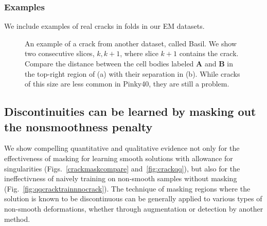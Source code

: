 \documentclass{article}
\begin{document}
\subsubsection{Examples}
We include examples of real cracks in folds in our EM datasets.

\begin{figure}[htp]
	\centering
	\caption[Example of a crack in the Basil EM dataset]{An example of a crack from another dataset, called Basil. We show two consecutive slices, $k,k+1$, where slice $k+1$ contains the crack. Compare the distance between the cell bodies labeled \textbf{A} and \textbf{B} in the top-right region of (a) with their separation in (b). While cracks of this size are less common in Pinky40, they are still a problem.}\label{cracks}
\end{figure}


\subsection{Discontinuities can be learned by masking out the nonsmoothness penalty}

We show compelling quantitative and qualitative evidence not only for the effectiveness of masking for learning smooth solutions with allowance for singularities (Figs.~\ref{crackmaskcompare} and~\ref{fig:crackqq}), but also for the ineffectivness of naively training on non-smooth samples without masking (Fig.~\ref{fig:qqcracktrainnnocrack}). The technique of masking regions where the solution is known to be discontinuous can be generally applied to various types of non-smooth deformations, whether through augmentation or detection by another method.
\end{document}
